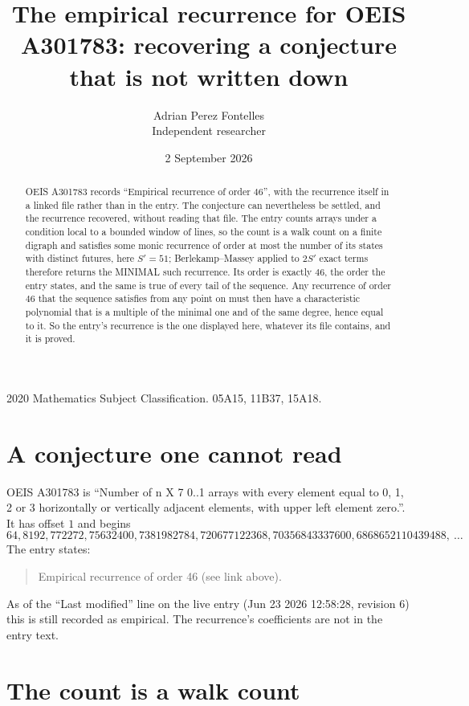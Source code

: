 \documentclass[11pt,a4paper]{article}
\title{The empirical recurrence for OEIS A301783: recovering a conjecture that is not written down}
\author{Adrian Perez Fontelles\\ \small Independent researcher}
\date{2 September 2026}
\theoremstyle{plain}
\theoremstyle{definition}
\begin{document}
\maketitle

\begin{abstract}
OEIS A301783 records ``Empirical recurrence of order $46$'', with the recurrence itself in a
linked file rather than in the entry. The conjecture can nevertheless be settled, and the
recurrence recovered, without reading that file. The entry counts arrays under a condition
local to a bounded window of lines, so the count is a walk count on a finite digraph and
satisfies some monic recurrence of order at most the number of its states with distinct
futures, here $S'=51$; Berlekamp--Massey applied to $2S'$ exact
terms therefore returns the MINIMAL such recurrence. Its order is exactly $46$, the order
the entry states, and the same is true of every tail of the sequence. Any recurrence of order
$46$ that the sequence satisfies from any point on must then have a characteristic
polynomial that is a multiple of the minimal one and of the same degree, hence equal to it. So
the entry's recurrence is the one displayed here, whatever its file contains, and it is
proved.
\end{abstract}

\noindent\small 2020 Mathematics Subject Classification. 05A15, 11B37, 15A18.\normalsize

\section{A conjecture one cannot read}

OEIS A301783 is ``Number of n X 7 0..1 arrays with every element equal to 0, 1, 2 or 3 horizontally or vertically adjacent elements, with upper left element zero.''. It has offset $1$ and begins
\[
64, 8192, 772272, 75632400, 7381982784, 720677122368, 70356843337600, 6868652110439488,\ \dots
\]
The entry states:
\begin{quote}
Empirical recurrence of order 46 (see link above).
\end{quote}
As of the ``Last modified'' line on the live entry (Jun 23 2026 12:58:28, revision 6) this is still
recorded as empirical. The recurrence's coefficients are not in the entry text.

\section{The count is a walk count}
\end{document}
